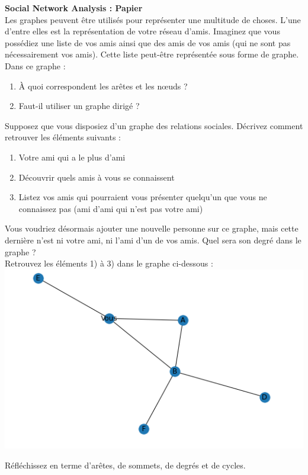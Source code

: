 \begin{Exercice}[10 minutes] \textbf{Social Network Analysis : Papier}\\
    Les graphes peuvent être utilisés pour représenter une multitude de choses.  L'une d'entre elles est la représentation de votre réseau d'amis. Imaginez que vous possédiez une liste de vos amis ainsi que des amis de vos amis (qui ne sont pas nécessairement vos amis). Cette liste peut-être représentée sous forme de graphe. Dans ce graphe :\\
    \begin{enumerate}
        \item  À quoi correspondent les arêtes et les nœuds ? 
        \item Faut-il utiliser un graphe dirigé ?
    \end{enumerate}
    Supposez que vous disposiez d'un graphe des relations sociales. Décrivez comment retrouver les éléments suivants :
    \begin{enumerate}
        \item Votre ami qui a le plus d'ami
        \item Découvrir quels amis à vous se connaissent
        \item Listez vos amis qui pourraient vous présenter quelqu'un que vous ne connaissez pas (ami d'ami qui n'est pas votre ami)
    \end{enumerate}
    Vous voudriez désormais ajouter une nouvelle personne sur ce graphe, mais cette dernière n'est ni votre ami, ni l'ami d'un de vos amis. Quel sera son degré dans le graphe ?\\
    
    Retrouvez les éléments 1) à 3) dans le graphe ci-dessous :\\
    \includegraphics[]{resources/Network1.PNG}
    \begin{conseil}
        Réfléchissez en terme d'arêtes, de sommets, de degrés et de cycles.
    \end{conseil}


\end{Exercice}
